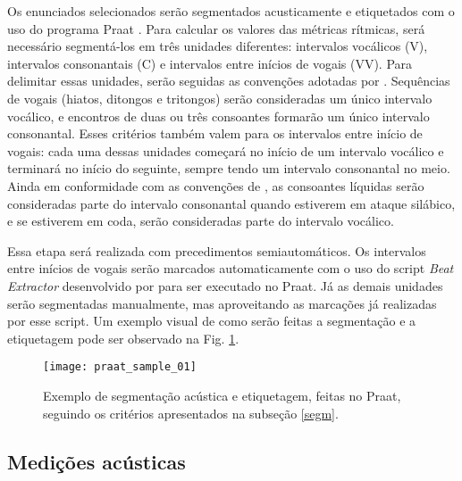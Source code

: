 \documentclass[
	a4paper,	%
	12pt,		%
	]{article}	%
\begin{document}
Os enunciados selecionados serão segmentados acusticamente e etiquetados com
o uso do programa Praat \citep{Boersma.Weenink2019}. Para calcular os
valores das métricas rítmicas, será necessário segmentá-los em três unidades
diferentes: intervalos vocálicos (V), intervalos consonantais (C) e
intervalos entre inícios de vogais (VV). Para delimitar essas unidades,
serão seguidas as convenções adotadas por \citet{Ramus.etal1999}.
Sequências de vogais (hiatos, ditongos e tritongos) serão consideradas um
único intervalo vocálico, e encontros de duas ou três consoantes formarão um
único intervalo consonantal. Esses critérios também valem para os intervalos
entre início de vogais: cada uma dessas unidades começará no início de um
intervalo vocálico e terminará no início do seguinte, sempre tendo um
intervalo consonantal no meio. Ainda em conformidade com as convenções de
\citet{Ramus.etal1999}, as consoantes líquidas serão consideradas parte do
intervalo consonantal quando estiverem em ataque silábico, e se estiverem em
coda, serão consideradas parte do intervalo vocálico.

Essa etapa será realizada com precedimentos semiautomáticos. Os intervalos
entre inícios de vogais serão marcados automaticamente com o uso do script
\emph{Beat Extractor} desenvolvido por \citet{Barbosa2003} para ser
executado no Praat. Já as demais unidades serão segmentadas manualmente, mas
aproveitando as marcações já realizadas por esse script. Um exemplo visual
de como serão feitas a segmentação e a etiquetagem pode ser observado na
Fig. \ref{praat}.

\begin{figure}[h]
	\vspace{1em}
	\caption{Exemplo de segmentação acústica e etiquetagem, feitas no Praat,
		seguindo os critérios apresentados na subseção \ref{segm}.}
	\label{praat}
	\centering
	\texttt{[image: praat\_sample\_01]}
\end{figure}
		
\subsection{Medições acústicas} \label{medicoes}
\end{document}
